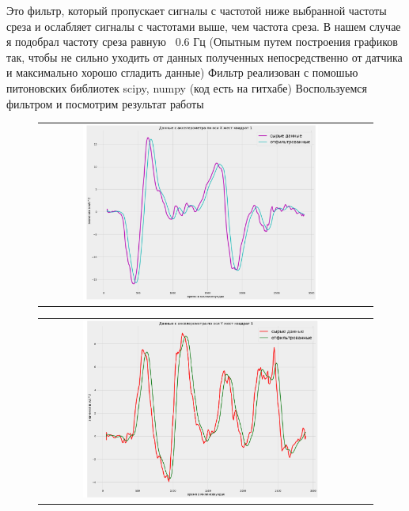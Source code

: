 Это фильтр, который пропускает сигналы с 
частотой ниже выбранной частоты среза и 
ослабляет сигналы с частотами выше, чем частота
среза.
В нашем случае я подобрал частоту среза равную  0.6 Гц (Опытным путем построения графиков так, чтобы 
не сильно уходить от данных полученных непосредственно от датчика и максимально хорошо сгладить данные)
Фильтр реализован с помошью питоновских библиотек scipy, numpy (код есть на гитхабе) 
Воспользуемся фильтром и посмотрим результат работы
\begin{figure}[H]
    \begin{center}
        \begin{tabular}{cc}
            \includegraphics[width=0.75\textwidth]{farim/squares} & 
        \end{tabular}
    \end{center}
\end{figure}
\begin{figure}[H]
    \begin{center}
        \begin{tabular}{cc}
            \includegraphics[width=0.75\textwidth]{farim/sqxres} & 
        \end{tabular}
    \end{center}
\end{figure}

